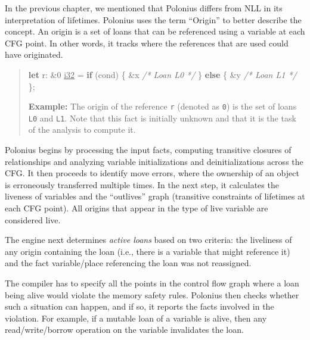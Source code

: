 \documentclass[
  11pt,
  twoside,symmetric]{report}
\newenvironment{Shaded}{}{}
\newcommand{\CharTok}[1]{#1}
\newcommand{\CommentTok}[1]{\textit{#1}}
\newcommand{\ControlFlowTok}[1]{\textbf{#1}}
\newcommand{\DataTypeTok}[1]{\underline{#1}}
\newcommand{\DecValTok}[1]{#1}
\newcommand{\KeywordTok}[1]{\textbf{#1}}
\newcommand{\NormalTok}[1]{#1}
\newcommand{\OperatorTok}[1]{#1}
\begin{document}
In the previous chapter, we mentioned that Polonius differs from NLL in
its interpretation of lifetimes. Polonius uses the term ``Origin'' to
better describe the concept. An origin is a set of loans that can be
referenced using a variable at each CFG point. In other words, it tracks
where the references that are used could have originated.

\begin{quote}
\begin{Shaded}
\begin{Highlighting}[]
\KeywordTok{let}\NormalTok{ r}\OperatorTok{:} \OperatorTok{\&}\CharTok{\textquotesingle{}}\DecValTok{0} \DataTypeTok{i32} \OperatorTok{=} \ControlFlowTok{if}\NormalTok{ (cond) }\OperatorTok{\{}
    \OperatorTok{\&}\NormalTok{x }\CommentTok{/* Loan L0 */}
\OperatorTok{\}} \ControlFlowTok{else} \OperatorTok{\{}
    \OperatorTok{\&}\NormalTok{y }\CommentTok{/* Loan L1 */}
\OperatorTok{\};}
\end{Highlighting}
\end{Shaded}

\textbf{Example:} The origin of the reference \texttt{r} (denoted as
\texttt{\textquotesingle{}0}) is the set of loans \texttt{L0} and
\texttt{L1}. Note that this fact is initially unknown and that it is the
task of the analysis to compute it.
\end{quote}

Polonius begins by processing the input facts, computing transitive
closures of relationships and analyzing variable initializations and
deinitializations across the CFG. It then proceeds to identify move
errors, where the ownership of an object is erroneously transferred
multiple times. In the next step, it calculates the liveness of
variables and the ``outlives'' graph (transitive constraints of
lifetimes at each CFG point). All
origins that appear in the type of live variable are considered live.

The engine next determines \emph{active loans} based on two criteria:
the liveliness of any origin containing the loan (i.e., there is a
variable that might reference it) and the fact variable/place
referencing the loan was not reassigned.

The compiler has to specify all the points in the control flow graph
where a loan being alive would violate the memory safety rules. Polonius
then checks whether such a situation can happen, and if so, it reports
the facts involved in the violation. For example, if a mutable loan of a
variable is alive, then any read/write/borrow operation on the variable
invalidates the loan.
\end{document}
